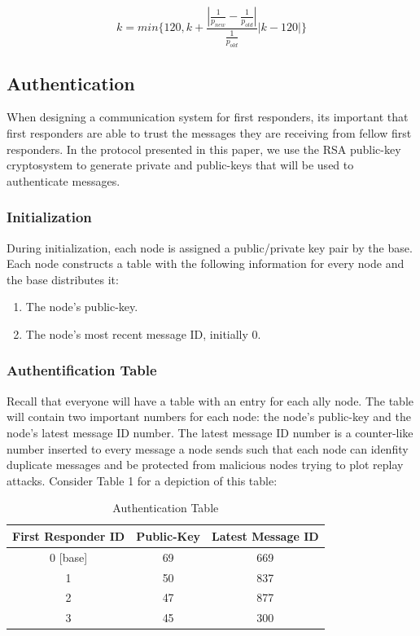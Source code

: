\documentclass[letterpaper]{article}
\begin{document}
$$ k = min\{120, k +  \frac{|\frac{1}{p_{new}} - \frac{1}{p_{old}}|}{\frac{1}{p_{old}}}|k - 120|   \}$$ 

\subsection{Authentication}
When designing a communication system for first responders, its important that first responders are able to trust the messages they are receiving from fellow first responders. In the protocol presented in this paper, we use the RSA public-key cryptosystem to generate private and public-keys that will be used to authenticate messages.

\subsubsection{Initialization}
During initialization, each node is assigned a public/private key pair by the base. Each node constructs a table with the following information for every node and the base distributes it:

\begin{enumerate}
  \item The node's public-key. 
  \item The node's most recent message ID, initially 0.
\end{enumerate}

\subsubsection{Authentification Table}
Recall that everyone will have a table with an entry for each ally node. The table will contain two important numbers for each node: the node's public-key and the node's latest message ID number. The latest message ID number is a counter-like number inserted to every message a node sends such that each node can idenfity duplicate messages and be protected from malicious nodes trying to plot replay attacks. Consider Table 1 for a depiction of this table:

\begin{table}[ht]
\caption{Authentication Table} %
\centering %
\begin{tabular}{c c c } %
\hline
\hline %
First Responder ID & Public-Key & Latest Message ID  \\[0.5ex] %
\hline %
0 [base] & 69 & 669\\
1 & 50 & 837\\
2 & 47 & 877 \\
3 & 45 & 300\\ [1ex]
\hline
\end{tabular}
\label{table:nonlin}
\end{table}
\end{document}
